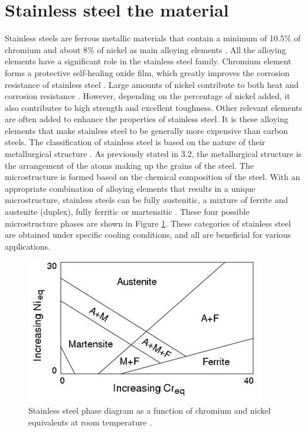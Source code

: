 \documentclass[12pt]{report}
\begin{document}
\section{Stainless steel the material} 
Stainless steels are ferrous metallic materials that contain a minimum of 10.5\% of chromium and about 8\% of nickel as main alloying elements \cite{sourmail2005stainless}. All the alloying elements have a significant role in the stainless steel family. Chromium element forms a protective self-healing oxide film, which greatly improves the corrosion resistance of stainless steel \cite{molabe2018determining}. Large amounts of nickel contribute to both heat and corrosion resistance \cite{george2002introduction}. However, depending on the percentage of nickel added, it also contributes to high strength and excellent toughness. Other relevant elements are often added to enhance the properties of stainless steel. It is these alloying elements that make stainless steel to be generally more expensive than carbon steels.
The classification of stainless steel is based on the nature of their metallurgical structure \cite{bhadeshia2017steels}. As previously stated in 3.2, the metallurgical structure is the arrangement of the atoms making up the grains of the steel. The microstructure is formed based on the chemical composition of the steel. With an appropriate combination of alloying elements that results in a unique microstructure, stainless steels can be fully austenitic, a mixture of ferrite and austenite (duplex), fully ferritic or martensitic \cite{bhadeshia2017steels}. These four possible microstructure phases are shown in Figure \ref{ch3:figure:steel_phase}. These categories of stainless steel are obtained under specific cooling conditions, and all are beneficial for various applications.
 
\begin{figure}[H]
    \centering
    \includegraphics[width=.65\textwidth]{stainless_steel_phase.jpg}
    \caption{Stainless steel phase diagram as a function of chromium and nickel equivalents at room temperature \cite{bhadeshia2017steels}.}
    \label{ch3:figure:steel_phase}
\end{figure}
\end{document}
